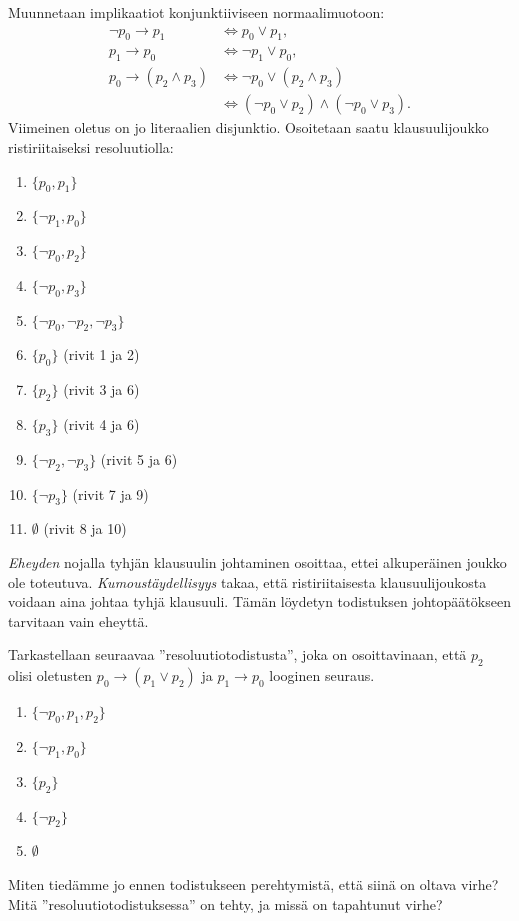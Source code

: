\documentclass[11pt,a4paper]{amsart}
\begin{document}
\begin{solution}
Muunnetaan implikaatiot konjunktiiviseen normaalimuotoon:
\[
\begin{aligned}
\neg p_0\to p_1 &\iff p_0\lor p_1,\\
p_1\to p_0 &\iff \neg p_1\lor p_0,\\
p_0\to(p_2\land p_3)
&\iff \neg p_0\lor(p_2\land p_3)\\
&\iff (\neg p_0\lor p_2)\land(\neg p_0\lor p_3).
\end{aligned}
\]
Viimeinen oletus on jo literaalien disjunktio. Osoitetaan saatu
klausuulijoukko ristiriitaiseksi resoluutiolla:
\begin{enumerate}[label=\arabic*., nosep]
\item \(\{p_0,p_1\}\)
\item \(\{\neg p_1,p_0\}\)
\item \(\{\neg p_0,p_2\}\)
\item \(\{\neg p_0,p_3\}\)
\item \(\{\neg p_0,\neg p_2,\neg p_3\}\)
\item \(\{p_0\}\) (rivit 1 ja 2)
\item \(\{p_2\}\) (rivit 3 ja 6)
\item \(\{p_3\}\) (rivit 4 ja 6)
\item \(\{\neg p_2,\neg p_3\}\) (rivit 5 ja 6)
\item \(\{\neg p_3\}\) (rivit 7 ja 9)
\item \(\emptyset\) (rivit 8 ja 10)
\end{enumerate}
\emph{Eheyden} nojalla tyhjän klausuulin johtaminen osoittaa, ettei
alkuperäinen joukko ole toteutuva. \emph{Kumoustäydellisyys} takaa, että
ristiriitaisesta klausuulijoukosta voidaan aina johtaa tyhjä klausuuli.
Tämän löydetyn todistuksen johtopäätökseen tarvitaan vain eheyttä.
\end{solution}

\begin{exercise}
Tarkastellaan seuraavaa ”resoluutiotodistusta”, joka on osoittavinaan, että
\(p_2\) olisi oletusten \(p_0 \rightarrow (p_1 \lor p_2)\) ja
\(p_1 \rightarrow p_0\) looginen seuraus.
\begin{enumerate}[label=\arabic*., nosep]
\item \(\{\neg p_0, p_1, p_2\}\)
\item \(\{\neg p_1, p_0\}\)
\item \(\{p_2\}\)
\item \(\{\neg p_2\}\)
\item \(\emptyset\)
\end{enumerate}
Miten tiedämme jo ennen todistukseen perehtymistä, että siinä on oltava
virhe? Mitä ”resoluutiotodistuksessa” on tehty, ja missä on tapahtunut virhe?
\end{exercise}
\end{document}
